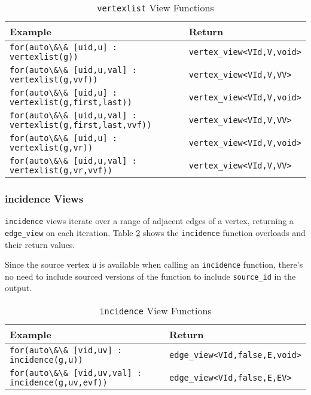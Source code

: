 \documentclass[10pt,onecolumn]{article}
\newcommand{\tcode}[1]{\lstinline[breaklines=true]{#1}}
\begin{document}
\begin{table}[h!]
\begin{center}
{\begin{tabular}{l l}
\hline
    \textbf{Example} & \textbf{Return} \\
\hline
    \tcode{for(auto\&\& [uid,u] : vertexlist(g))} & \tcode{vertex_view<VId,V,void>} \\
    \tcode{for(auto\&\& [uid,u,val] : vertexlist(g,vvf))} & \tcode{vertex_view<VId,V,VV>} \\
    \tcode{for(auto\&\& [uid,u] : vertexlist(g,first,last))} & \tcode{vertex_view<VId,V,void>} \\
    \tcode{for(auto\&\& [uid,u,val] : vertexlist(g,first,last,vvf))} & \tcode{vertex_view<VId,V,VV>} \\
    \tcode{for(auto\&\& [uid,u] : vertexlist(g,vr))} & \tcode{vertex_view<VId,V,void>} \\
    \tcode{for(auto\&\& [uid,u,val] : vertexlist(g,vr,vvf))} & \tcode{vertex_view<VId,V,VV>} \\
\hline
\end{tabular}}
\caption{\tcode{vertexlist} View Functions}
\label{tab:vertexlist}
\end{center}
\end{table}

\subsubsection{incidence Views}
\tcode{incidence} views iterate over a range of adjacent edges of a vertex, returning a \tcode{edge_view} on each iteration. 
Table \ref{tab:incidence} shows the \tcode{incidence} function overloads and their return values. 

Since the source vertex \tcode{u} is available when calling an \tcode{incidence} function, there's no need to include sourced versions of the function to include \tcode{source_id} in the output.

\begin{table}[h!]
\begin{center}
{\begin{tabular}{l l}
\hline
    \textbf{Example} & \textbf{Return} \\
\hline
    \tcode{for(auto\&\& [vid,uv] : incidence(g,u))} & \tcode{edge_view<VId,false,E,void>} \\
    \tcode{for(auto\&\& [vid,uv,val] : incidence(g,uv,evf))} & \tcode{edge_view<VId,false,E,EV>} \\
\hline
\end{tabular}}
\caption{\tcode{incidence} View Functions}
\label{tab:incidence}
\end{center}
\end{table}
\end{document}
